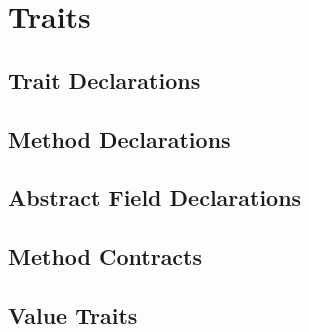 %
%
%
%

\chapter{Traits}

\section{Trait Declarations}
\section{Method Declarations}
\section{Abstract Field Declarations}
\section{Method Contracts}
\section{Value Traits}
